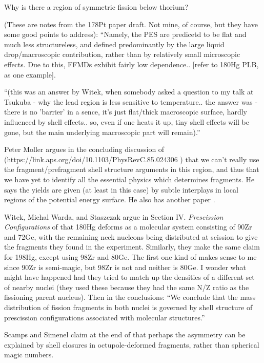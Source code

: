 Why is there a region of symmetric fission below thorium?

(These are notes from the 178Pt paper draft. Not mine, of course, but they have some good points to address): ``Namely, the PES are predicetd to be flat and much less structureless, and defined predominantly by the large liquid drop/macroscopic contribution, rather than by relatively small microscopic effects. Due to this, FFMDs exhibit fairly low dependence..  [refer to 180Hg PLB, as one example].

``(this was an answer by Witek, when somebody asked a question to my talk at Tsukuba - why the lead region is less sensitive to temperature.. the answer was - there is no 'barrier' in a sence, it's just flat/thick macroscopic surface, hardly influenced by shell effects.. so, even if one heats it up, tiny shell effects will be gone, but the main underlying macroscopic part will remain).''

Peter Moller argues in the concluding discussion of (https://link.aps.org/doi/10.1103/PhysRevC.85.024306 \cite{Moller2012}) that we can't really use the fragment/prefragment shell structure arguments in this region, and thus that we have yet to identify all the essential physics which determines fragments. He says the yields are given (at least in this case) by subtle interplays in local regions of the potential energy surface. He also has another paper \cite{Ichikawa2019}.

Witek, Michal Warda, and Staszczak argue in Section IV. \textit{Prescission Configurations} of \cite{Warda2012a} that 180Hg deforms as a molecular system consisting of 90Zr and 72Ge, with the remaining neck nucleons being distributed at scission to give the fragments they found in the experiment. Similarly, they make the same claim for 198Hg, except using 98Zr and 80Ge. The first one kind of makes sense to me since 90Zr is semi-magic, but 98Zr is not and neither is 80Ge. I wonder what might have happened had they tried to match up the densities of a different set of nearby nuclei (they used these because they had the same N/Z ratio as the fissioning parent nucleus). Then in the conclusions: ``We conclude that the mass distribution of fission fragments in both nuclei is governed by shell structure of prescission configurations associated with molecular structures.''

Scamps and Simenel claim at the end of \cite{Scamps2018a} that perhaps the asymmetry can be explained by shell closures in octupole-deformed fragments, rather than spherical magic numbers.

